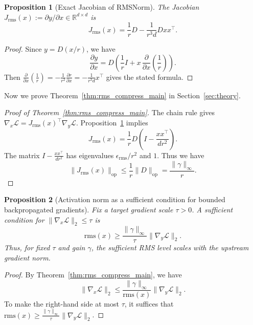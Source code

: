 \documentclass{article}
\theoremstyle{plain}
\newtheorem{proposition}{Proposition}
\theoremstyle{definition}
\theoremstyle{remark}
\begin{document}
\begin{proposition}[Exact Jacobian of RMSNorm]\label{prop:rms-jac-app}
The Jacobian $J_{\mathrm{rms}}(x) := \partial y / \partial x \in \mathbb{R}^{d\times d}$ is
\[
    J_{\mathrm{rms}}(x) = \frac{1}{r}D - \frac{1}{r^3 d} D x x^\top.
\]
\end{proposition}

\begin{proof}
Since $y = D(x/r)$, we have
\[
    \frac{\partial y}{\partial x} = D\left(\frac{1}{r}I + x\,\frac{\partial}{\partial x}\left(\frac{1}{r}\right)\right).
\]
Then $\frac{\partial}{\partial x}\left(\frac{1}{r}\right) = -\frac{1}{r^2}\frac{\partial r}{\partial x} = -\frac{1}{r^3 d}x^\top$ gives the stated formula.
\end{proof}

Now we prove Theorem~\ref{thm:rms_compress_main} in Section~\ref{sec:theory}.

\begin{proof}[Proof of Theorem~\ref{thm:rms_compress_main}]
The chain rule gives $\nabla_x \mathcal{L} = J_{\mathrm{rms}}(x)^\top\nabla_y \mathcal{L}$. Proposition~\ref{prop:rms-jac-app} implies
\[
    J_{\mathrm{rms}}(x) = \frac{1}{r}D \left(I - \frac{x x^\top}{dr^2}\right).
\]
The matrix $I - \frac{x x^\top}{dr^2}$ has eigenvalues $\epsilon_{\mathrm{rms}}/r^2$ and $1$. Thus we have
\[
    \|J_{\mathrm{rms}}(x)\|_{\mathrm{op}}
    \le \frac{1}{r}\|D\|_{\mathrm{op}} = \frac{\|\gamma\|_\infty}{r}.
\]
\end{proof}

\begin{proposition}[Activation norm as a sufficient condition for bounded backpropagated gradients]\label{prop:required-rms-app}
Fix a target gradient scale $\tau > 0$. A sufficient condition for $\|\nabla_x \mathcal{L}\|_2 \le \tau$ is
\[
    \mathrm{rms}(x) \ge \frac{\|\gamma\|_\infty}{\tau} \|\nabla_y \mathcal{L}\|_2.
\]
Thus, for fixed $\tau$ and gain $\gamma$, the sufficient RMS level scales with the upstream gradient norm.
\end{proposition}

\begin{proof}
By Theorem~\ref{thm:rms_compress_main}, we have
\[
    \|\nabla_x \mathcal{L}\|_2 \le \frac{\|\gamma\|_\infty}{\mathrm{rms}(x)}\|\nabla_y \mathcal{L}\|_2.
\]
To make the right-hand side at most $\tau$, it suffices that $\mathrm{rms}(x) \ge \frac{\|\gamma\|_\infty}{\tau} \|\nabla_y \mathcal{L}\|_2$.
\end{proof}
\end{document}
